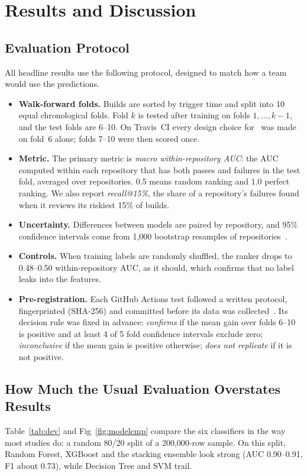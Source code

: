 \chapter{Results and Discussion}
\label{ch:results}

\section{Evaluation Protocol}
\label{sec:protocol}
All headline results use the following protocol, designed to match how a team would use the predictions.
\begin{itemize}
\item \textbf{Walk-forward folds.} Builds are sorted by trigger time and split into 10 equal chronological folds. Fold $k$ is tested after training on folds $1,\dots,k-1$, and the test folds are 6--10. On Travis~CI every design choice for \tierE\ was made on fold~6 alone; folds 7--10 were then scored once.
\item \textbf{Metric.} The primary metric is \emph{macro within-repository AUC}: the AUC computed within each repository that has both passes and failures in the test fold, averaged over repositories. 0.5 means random ranking and 1.0 perfect ranking. We also report \emph{recall@15\%}, the share of a repository's failures found when it reviews its riskiest 15\% of builds.
\item \textbf{Uncertainty.} Differences between models are paired by repository, and 95\% confidence intervals come from 1,000 bootstrap resamples of repositories~\cite{efron1993introduction}.
\item \textbf{Controls.} When training labels are randomly shuffled, the ranker drops to 0.48--0.50 within-repository AUC, as it should, which confirms that no label leaks into the features.
\item \textbf{Pre-registration.} Each GitHub Actions test followed a written protocol, fingerprinted (SHA-256) and committed before its data was collected~\cite{nosek2018preregistration}. Its decision rule was fixed in advance: \emph{confirms} if the mean gain over folds 6--10 is positive and at least 4 of 5 fold confidence intervals exclude zero; \emph{inconclusive} if the mean gain is positive otherwise; \emph{does not replicate} if it is not positive.
\end{itemize}

\section{How Much the Usual Evaluation Overstates Results}
\label{sec:leakage}
Table~\ref{tab:dev} and Fig~\ref{fig:modelcmp} compare the six classifiers in the way most studies do: a random 80/20 split of a 200,000-row sample. On this split, Random Forest, XGBoost and the stacking ensemble look strong (AUC 0.90--0.91, F1 about 0.73), while Decision Tree and SVM trail.

